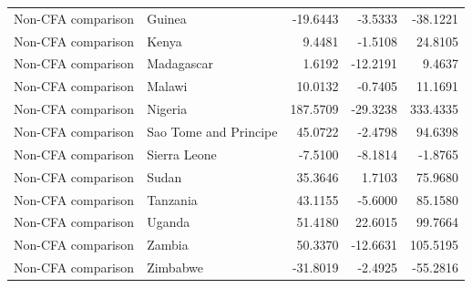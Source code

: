 \begin{table}
\begin{tabular}[t]{llrrr}
Non-CFA comparison & Guinea & -19.6443 & -3.5333 & -38.1221\\
Non-CFA comparison & Kenya & 9.4481 & -1.5108 & 24.8105\\
\addlinespace
Non-CFA comparison & Madagascar & 1.6192 & -12.2191 & 9.4637\\
Non-CFA comparison & Malawi & 10.0132 & -0.7405 & 11.1691\\
Non-CFA comparison & Nigeria & 187.5709 & -29.3238 & 333.4335\\
Non-CFA comparison & Sao Tome and Principe & 45.0722 & -2.4798 & 94.6398\\
Non-CFA comparison & Sierra Leone & -7.5100 & -8.1814 & -1.8765\\
\addlinespace
Non-CFA comparison & Sudan & 35.3646 & 1.7103 & 75.9680\\
Non-CFA comparison & Tanzania & 43.1155 & -5.6000 & 85.1580\\
Non-CFA comparison & Uganda & 51.4180 & 22.6015 & 99.7664\\
Non-CFA comparison & Zambia & 50.3370 & -12.6631 & 105.5195\\
Non-CFA comparison & Zimbabwe & -31.8019 & -2.4925 & -55.2816\\
\bottomrule
\end{tabular}
\end{table}